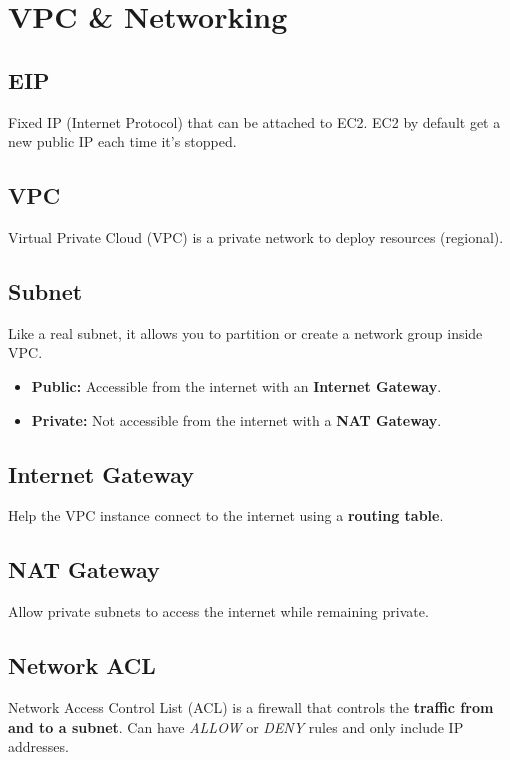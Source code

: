 \section{VPC \& Networking}\label{sec:vpc-networking}

\subsection{EIP}\label{subsec:eip}
Fixed IP (Internet Protocol) that can be attached to EC2.
EC2 by default get a new public IP each time it's stopped.

\subsection{VPC}\label{subsec:vpc}
Virtual Private Cloud (VPC) is a private network to deploy resources (regional).

\subsection{Subnet}\label{subsec:subnet}
Like a real subnet, it allows you to partition or create a network group inside VPC.

\begin{itemize}
    \item{\textbf{Public:} Accessible from the internet with an \textbf{Internet Gateway}.}
    \item{\textbf{Private:} Not accessible from the internet with a \textbf{NAT Gateway}.}
\end{itemize}

\subsection{Internet Gateway}\label{subsec:internet-gateway}
Help the VPC instance connect to the internet using a \textbf{routing table}.

\subsection{NAT Gateway}\label{subsec:nat-gateway}
Allow private subnets to access the internet while remaining private.

\subsection{Network ACL}\label{subsec:network-acl}
Network Access Control List (ACL) is a firewall that controls the \textbf{traffic from and to a subnet}\@.
Can have \textit{ALLOW} or \textit{DENY} rules and only include IP addresses.

